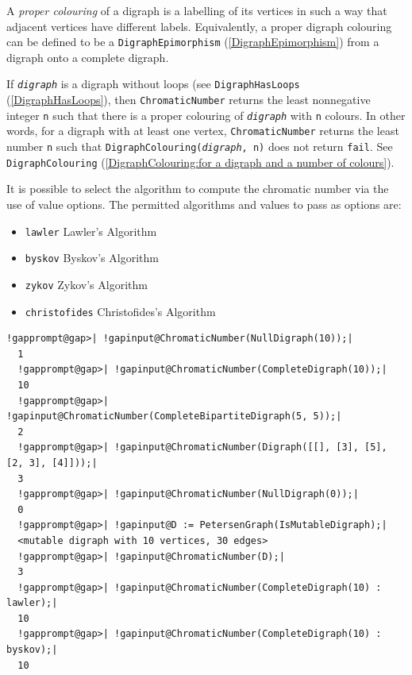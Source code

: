 \documentclass[a4paper,11pt]{report}
\begin{document}
{{{ A \emph{proper colouring} of a digraph is a labelling of its vertices in such a way that adjacent
vertices have different labels. Equivalently, a proper digraph colouring can
be defined to be a \texttt{DigraphEpimorphism} (\ref{DigraphEpimorphism}) from a digraph onto a complete digraph. 

 If \mbox{\texttt{\mdseries\slshape digraph}} is a digraph without loops (see \texttt{DigraphHasLoops} (\ref{DigraphHasLoops}), then \texttt{ChromaticNumber} returns the least non\texttt{}negative integer \texttt{n} such that there is a proper colouring of \mbox{\texttt{\mdseries\slshape digraph}} with \texttt{n} colours. In other words, for a digraph with at least one vertex, \texttt{ChromaticNumber} returns the least number \texttt{n} such that \texttt{DigraphColouring(\mbox{\texttt{\mdseries\slshape digraph}}, n)} does not return \texttt{fail}. See \texttt{DigraphColouring} (\ref{DigraphColouring:for a digraph and a number of colours}). 

 It is possible to select the algorithm to compute the chromatic number via the
use of value options. The permitted algorithms and values to pass as options
are: 
\begin{itemize}
\item \texttt{lawler} \texttt{} Lawler's Algorithm \cite{Law1976}
\item \texttt{byskov} \texttt{} Byskov's Algorithm \cite{Bys2002}
\item \texttt{zykov} \texttt{} Zykov's Algorithm \cite{Corneil1973}
\item \texttt{christofides} \texttt{} Christofides's Algorithm \cite{Wang1974}
\end{itemize}
 
\begin{Verbatim}[commandchars=!@|,fontsize=\small,frame=single,label=Example]
  !gapprompt@gap>| !gapinput@ChromaticNumber(NullDigraph(10));|
  1
  !gapprompt@gap>| !gapinput@ChromaticNumber(CompleteDigraph(10));|
  10
  !gapprompt@gap>| !gapinput@ChromaticNumber(CompleteBipartiteDigraph(5, 5));|
  2
  !gapprompt@gap>| !gapinput@ChromaticNumber(Digraph([[], [3], [5], [2, 3], [4]]));|
  3
  !gapprompt@gap>| !gapinput@ChromaticNumber(NullDigraph(0));|
  0
  !gapprompt@gap>| !gapinput@D := PetersenGraph(IsMutableDigraph);|
  <mutable digraph with 10 vertices, 30 edges>
  !gapprompt@gap>| !gapinput@ChromaticNumber(D);|
  3
  !gapprompt@gap>| !gapinput@ChromaticNumber(CompleteDigraph(10) : lawler);|
  10
  !gapprompt@gap>| !gapinput@ChromaticNumber(CompleteDigraph(10) : byskov);|
  10
\end{Verbatim}
 }

}}
\end{document}
